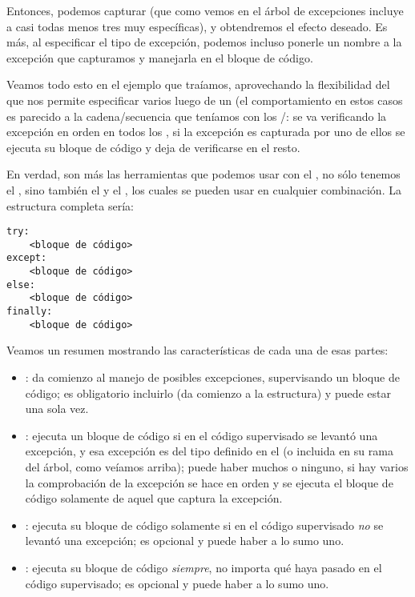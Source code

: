 Entonces, podemos capturar  (que como vemos en el árbol de excepciones incluye a casi todas menos tres muy específicas), y obtendremos el efecto deseado. Es más, al especificar el tipo de excepción, podemos incluso ponerle un nombre a la excepción que capturamos y manejarla en el bloque de código. 

Veamos todo esto en el ejemplo que traíamos, aprovechando la flexibilidad del  que nos permite especificar varios luego de un  (el comportamiento en estos casos es parecido a la cadena/secuencia que teníamos con los /: se va verificando la excepción en orden en todos los , si la excepción es capturada por uno de ellos se ejecuta su bloque de código y deja de verificarse en el resto.


En verdad, son más las herramientas que podemos usar con el , no sólo tenemos el , sino también el  y el , los cuales se pueden usar en cualquier combinación. La estructura completa sería:

\begin{verbatim}
try:
    <bloque de código>
except:
    <bloque de código>
else:
    <bloque de código>
finally:
    <bloque de código>
\end{verbatim}

Veamos un resumen mostrando las características de cada una de esas partes:

\begin{itemize}
 \item {}: da comienzo al manejo de posibles excepciones, supervisando un bloque de código; es obligatorio incluirlo (da comienzo a la estructura) y puede estar una sola vez.
 \item {}: ejecuta un bloque de código si en el código supervisado se levantó una excepción, y esa excepción es del tipo definido en el  (o incluida en su rama del árbol, como veíamos arriba); puede haber muchos o ninguno, si hay varios la comprobación de la excepción se hace en orden y se ejecuta el bloque de código solamente de aquel que captura la excepción.
 \item {}: ejecuta su bloque de código solamente si en el código supervisado \textit{no} se levantó una excepción; es opcional y puede haber a lo sumo uno.
 \item {}: ejecuta su bloque de código \textit{siempre}, no importa qué haya pasado en el código supervisado; es opcional y puede haber a lo sumo uno.
\end{itemize}

